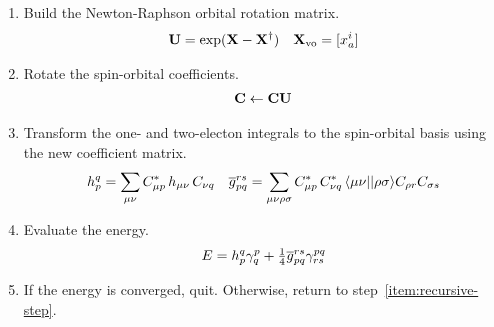 \documentclass[11pt]{article}
\begin{document}
\begin{enumerate}
\item
Build the Newton-Raphson orbital rotation matrix.
\begin{align}
  \mathbf{U}
=
  \mathrm{exp}(\mathbf{X} - \mathbf{X}^\dagger)
&&
  \mathbf{X}_{\mathrm{vo}}
=
  [x_a^i]
\end{align}

\item
Rotate the spin-orbital coefficients.
\begin{align}
  \mathbf{C}
\leftarrow
  \mathbf{C}\mathbf{U}
\end{align}

\item
Transform the one- and two-electon integrals to the spin-orbital basis using the new coefficient matrix.
\begin{align}
  h_p^q
=
  \sum_{\mu\nu}
  C_{\mu p}^*\,
  h_{\mu\nu}\,
  C_{\nu q}
&&
  \ol{g}_{pq}^{rs}
=
  \sum_{\mu\nu\rh\si}
  C_{\mu p}^*\,
  C_{\nu q}^*\,
  \ip{\mu \nu||\rh\si}
  C_{\rh r}
  C_{\si s}
\end{align}

\item
Evaluate the energy.
\begin{align}
  E
=
  h_p^q
  \gamma ^p_q
+
  \tfrac{1}{4}
  \overline{g}_{pq}^{rs}
  \gamma ^{pq}_{rs}
\end{align}

\item
If the energy is converged, quit.
Otherwise, return to step~\ref{item:recursive-step}.
\end{enumerate}
\end{document}
